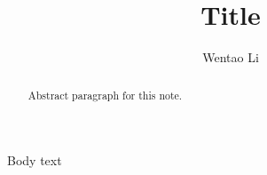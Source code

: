 \documentclass{article}
\author{Wentao Li}
\theoremstyle{definition}
\theoremstyle{plain}
\numberwithin{equation}{section}
\begin{document}
    
\title{Title}

\maketitle

\begin{abstract}
    Abstract paragraph for this note.
\end{abstract}

\tableofcontents

Body text
\printbibliography
\end{document}
